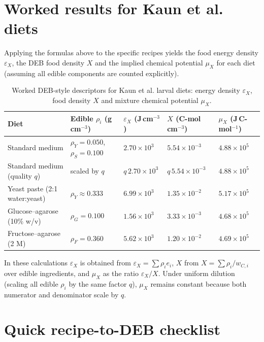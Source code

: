 \documentclass[11pt]{article}
\begin{document}
\section{Worked results for Kaun et al. diets}

Applying the formulas above to the specific recipes yields the food energy density $\varepsilon_X$, the DEB food density $X$ and the implied chemical potential $\mu_X$ for each diet (assuming all edible components are counted explicitly).

\begin{table}[h]
\centering
\begin{tabular}{lllll}
\toprule
Diet & Edible $\rho_i$ (g\,cm$^{-3}$) & $\varepsilon_X$ (J\,cm$^{-3}$) & $X$ (C-mol\,cm$^{-3}$) & $\mu_X$ (J\,C-mol$^{-1}$) \\
\midrule
Standard medium & $\rho_Y=0.050$, $\rho_S=0.100$ & $2.70\times10^{3}$ & $5.54\times10^{-3}$ & $4.88\times10^{5}$ \\
Standard medium (quality $q$) & scaled by $q$ & $q\,2.70\times10^{3}$ & $q\,5.54\times10^{-3}$ & $4.88\times10^{5}$ \\
Yeast paste (2:1 water:yeast) & $\rho_Y\approx0.333$ & $6.99\times10^{3}$ & $1.35\times10^{-2}$ & $5.17\times10^{5}$ \\
Glucose--agarose (10\% w/v) & $\rho_G=0.100$ & $1.56\times10^{3}$ & $3.33\times10^{-3}$ & $4.68\times10^{5}$ \\
Fructose--agarose (2 M) & $\rho_F=0.360$ & $5.62\times10^{3}$ & $1.20\times10^{-2}$ & $4.69\times10^{5}$ \\
\bottomrule
\end{tabular}
\caption{Worked DEB-style descriptors for Kaun et al. larval diets: energy density $\varepsilon_X$, food density $X$ and mixture chemical potential $\mu_X$.}
\label{tab:results}
\end{table}

In these calculations $\varepsilon_X$ is obtained from $\varepsilon_X = \sum \rho_i e_i$, $X$ from $X = \sum \rho_i / w_{C,i}$ over edible ingredients, and $\mu_X$ as the ratio $\varepsilon_X / X$. Under uniform dilution (scaling all edible $\rho_i$ by the same factor $q$), $\mu_X$ remains constant because both numerator and denominator scale by $q$.

\section{Quick recipe-to-DEB checklist}
\end{document}
